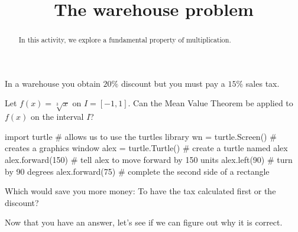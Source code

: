 \documentclass[handout]{ximera}
\title{The warehouse problem}
\begin{document}
\begin{abstract}
In this activity, we explore a fundamental property of multiplication. 
\end{abstract}
\maketitle

In a warehouse you obtain $20\%$ discount but you must pay a $15\%$
sales tax.

\begin{example}
Let $f(x)=\sqrt[3]{x}$ on $I=[-1,1]$. Can the Mean Value Theorem be applied to $f(x)$ on the interval $I$?

\begin{multipleChoice}
\end{multipleChoice}

\begin{explanation}
\end{explanation}
\end{example}


\begin{python}
  import turtle               # allows us to use the turtles library
  wn = turtle.Screen()        # creates a graphics window
  alex = turtle.Turtle()      # create a turtle named alex
  alex.forward(150)           # tell alex to move forward by 150 units
  alex.left(90)               # turn by 90 degrees
  alex.forward(75)            # complete the second side of a rectangle
\end{python}



\begin{question}
Which would save you more money: To have the tax calculated first or
the discount?
\begin{explanation}
\begin{multipleChoice}
\end{multipleChoice}
\end{explanation}
\end{question}

Now that you have an answer, let's see if we can figure out why it is
correct. 
\end{document}
